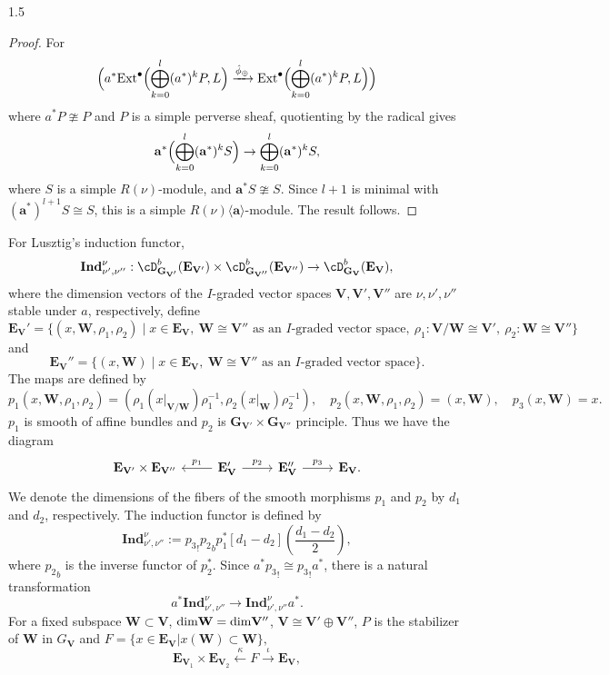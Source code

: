 \documentclass[10pt]{amsart}
\def\dim{\mbox{\rm dim}}   \def\End{\mbox{\rm End}}
\def\bfV{{\mathbf V}}
\def\bfV{\mathbf{V}}
\def\bfW{\mathbf{W}}
\def\bfE{\mathbf{E}}
\def\bfG{\mathbf{G}}
\def\Ind{\mathbf{Ind}}
\begin{document}
\begin{spacing}{1.5}
\begin{proof}
For
\[
\Bigl( a^* \mathrm{Ext}^{\bullet}\Bigl( \bigoplus_{k=0}^{l} (a^*)^k P, L \Bigr) 
\xrightarrow{\hat{\phi}_{\oplus}} 
\mathrm{Ext}^{\bullet}\Bigl( \bigoplus_{k=0}^{l} (a^*)^k P, L \Bigr) \Bigr)
\]
where $a^* P \ncong P$ and $P$ is a simple perverse sheaf, quotienting by the radical gives
\[
\mathbf{a}^* \Bigl( \bigoplus_{k=0}^{l} (\mathbf{a}^*)^k S \Bigr) \to \bigoplus_{k=0}^{l} (\mathbf{a}^*)^k S,
\]
where $S$ is a simple $R(\nu)$-module, and $\mathbf{a}^* S \ncong S$. Since $l+1$ is minimal with $(\mathbf{a}^*)^{l+1} S \cong S$, this is a simple $R(\nu)\langle\mathbf{a}\rangle$-module. The result follows.
\end{proof}
For Lusztig's induction functor,
\[
\Ind_{\nu',\nu''}^{\nu}:
\cD_{\bfG_{\bfV'}}^b(\bfE_{\bfV'})\times
\cD_{\bfG_{\bfV''}}^b(\bfE_{\bfV''})
\rightarrow \cD_{\bfG_{\bfV}}^b(\bfE_{\bfV}),
\]
where the dimension vectors of the $I$-graded vector spaces $\bfV, \bfV', \bfV''$ are $\nu, \nu', \nu''$ stable under $a$, respectively, define
\[
\bfE_{\bfV}'=\{(x,\bfW,\rho_1,\rho_2)\mid x\in \bfE_{\bfV},\ \bfW\cong \bfV''\text{ as an }I\text{-graded vector space},\
\rho_1:\bfV/\bfW\cong \bfV',\ \rho_2:\bfW\cong \bfV''\}
\]
and
\[
\bfE_{\bfV}''=\{(x,\bfW)\mid x\in \bfE_{\bfV},\ \bfW\cong \bfV''\text{ as an }I\text{-graded vector space}\}.
\]
The maps are defined by
\[
p_1(x,\bfW,\rho_1,\rho_2)=(\rho_1(x|_{\bfV/\bfW})\rho_1^{-1},\rho_2(x|_{\bfW})\rho_2^{-1}),
\quad p_2(x,\bfW,\rho_1,\rho_2)=(x,\bfW),
\quad p_3(x,\bfW)=x.
\]
$p_1$ is smooth of affine bundles and $p_2$ is $\bfG_{\bfV'}\times \bfG_{\bfV''}$ principle.
Thus we have the diagram
\[
\begin{tikzcd}
\bfE_{\bfV'}\times \bfE_{\bfV''} & \bfE_{\bfV}' \arrow[l, "p_1"'] \arrow[r, "p_2"] & \bfE_{\bfV}'' \arrow[r, "p_3"] & \bfE_{\bfV}.
\end{tikzcd}
\]
We denote the dimensions of the fibers of the smooth morphisms $p_1$ and $p_2$ by $d_1$ and $d_2$, respectively. The induction functor is defined by
\[
\Ind_{\nu',\nu''}^{\nu} := {p_3}_! {p_2}_b p_1^* [d_1 - d_2] \left( \frac{d_1 - d_2}{2} \right),
\] where ${p_2}_b$ is the inverse functor of $p_2^*.$
Since $a^* {p_3}_! \cong {p_3}_! a^*$, there is a natural transformation
\[
a^* \Ind_{\nu',\nu''}^{\nu} \rightarrow \Ind_{\nu',\nu''}^{\nu} a^*.
\]
For a fixed subspace $\bfW\subset \bfV$, $\dim \bfW=\dim \bfV''$, $\bfV\cong \bfV'\oplus\bfV''$, $P$ is the stabilizer of $\bfW$ in $G_{\bfV}$ and $F=\{x\in \bfE_{\bfV}|x(\bfW)\subset \bfW\},$ $$\bfE_{\bfV_1}\times \bfE_{\bfV_2}\xleftarrow{\kappa}F\xrightarrow{\iota}\bfE_{\bfV},$$


\end{spacing}
\end{document}
